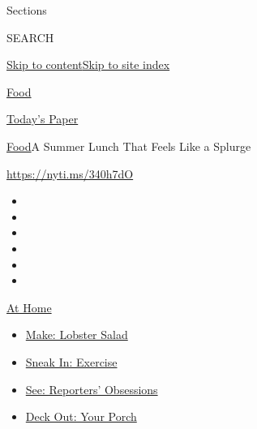 Sections

SEARCH

\protect\hyperlink{site-content}{Skip to
content}\protect\hyperlink{site-index}{Skip to site index}

\href{https://www.nytimes3xbfgragh.onion/section/food}{Food}

\href{https://myaccount.nytimes3xbfgragh.onion/auth/login?response_type=cookie\&client_id=vi}{}

\href{https://www.nytimes3xbfgragh.onion/section/todayspaper}{Today's
Paper}

\href{/section/food}{Food}\textbar{}A Summer Lunch That Feels Like a
Splurge

\url{https://nyti.ms/340h7dO}

\begin{itemize}
\item
\item
\item
\item
\item
\item
\end{itemize}

\href{https://www.nytimes3xbfgragh.onion/spotlight/at-home?action=click\&pgtype=Article\&state=default\&region=TOP_BANNER\&context=at_home_menu}{At
Home}

\begin{itemize}
\tightlist
\item
  \href{https://www.nytimes3xbfgragh.onion/2020/08/14/dining/lobster-salad-recipe.html?action=click\&pgtype=Article\&state=default\&region=TOP_BANNER\&context=at_home_menu}{Make:
  Lobster Salad}
\item
  \href{https://www.nytimes3xbfgragh.onion/2020/08/15/at-home/coronavirus-at-home-quick-exercises.html?action=click\&pgtype=Article\&state=default\&region=TOP_BANNER\&context=at_home_menu}{Sneak
  In: Exercise}
\item
  \href{https://www.nytimes3xbfgragh.onion/interactive/2020/at-home/even-more-reporters-editors-diaries-lists-recommendations.html?action=click\&pgtype=Article\&state=default\&region=TOP_BANNER\&context=at_home_menu}{See:
  Reporters' Obsessions}
\item
  \href{https://www.nytimes3xbfgragh.onion/2020/08/15/at-home/coronavirus-fall-patio-furniture.html?action=click\&pgtype=Article\&state=default\&region=TOP_BANNER\&context=at_home_menu}{Deck
  Out: Your Porch}
\end{itemize}

